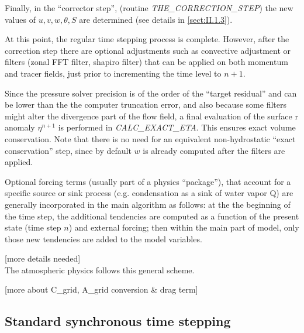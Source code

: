 Finally, in the ``corrector step'', (routine {\it
THE\_CORRECTION\_STEP}) the new values of $u,v,w,\theta,S$ are
determined (see details in \ref{sect:II.1.3}).

At this point, the regular time stepping process is complete. However,
after the correction step there are optional adjustments such as
convective adjustment or filters (zonal FFT filter, shapiro filter)
that can be applied on both momentum and tracer fields, just prior to
incrementing the time level to $n+1$.

Since the pressure solver precision is of the order of the ``target
residual'' and can be lower than the the computer truncation error,
and also because some filters might alter the divergence part of the
flow field, a final evaluation of the surface r anomaly $\eta^{n+1}$
is performed in {\it CALC\_EXACT\_ETA}. This ensures exact volume
conservation. Note that there is no need for an equivalent
non-hydrostatic ``exact conservation'' step, since by default $w$ is
already computed after the filters are applied.

Optional forcing terms (usually part of a physics ``package''), that
account for a specific source or sink process (e.g. condensation as a
sink of water vapor Q) are generally incorporated in the main
algorithm as follows: at the the beginning of the time step, the
additional tendencies are computed as a function of the present state
(time step $n$) and external forcing; then within the main part of
model, only those new tendencies are added to the model variables.

[more details needed]\\

The atmospheric physics follows this general scheme.

[more about C\_grid, A\_grid conversion \& drag term]\\



\subsection{Standard synchronous time stepping}

